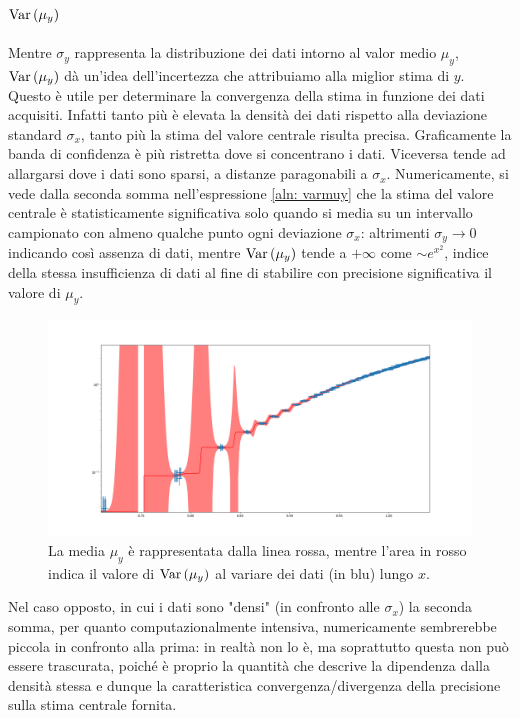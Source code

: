 \documentclass{article}[a4paper, oneside, 11pt]
\begin{document}
\subsection{$\text{Var}\left(\mu_y\right)$}
Mentre $\sigma_y$ rappresenta la distribuzione dei dati intorno al valor medio 
$\mu_y$, $\text{Var}\left(\mu_y\right)$ dà un'idea dell’incertezza che attribuiamo alla
miglior stima di $y$. Questo è utile per determinare la convergenza della
stima in funzione dei dati acquisiti.
Infatti tanto più è elevata la densità dei dati rispetto alla deviazione standard
$\sigma_x$, tanto più la stima del valore centrale risulta precisa. Graficamente
la banda di confidenza è più ristretta dove si concentrano i dati. Viceversa
tende ad allargarsi dove i dati sono sparsi, a distanze paragonabili a
$\sigma_x$. Numericamente, si vede dalla seconda somma nell'espressione
\eqref{aln: varmuy} che la stima del valore centrale è statisticamente
significativa solo quando si media su un intervallo campionato con almeno
qualche punto ogni deviazione $\sigma_x$: altrimenti $\sigma_y \to 0$
indicando così assenza di dati, mentre $\text{Var}\left(\mu_y\right)$ tende a $+\infty$ come
$\sim e^{x^2}$, indice della stessa insufficienza di dati al fine di stabilire
con precisione significativa il valore di $\mu_y$.
\begin{figure}[!htbp]
	\centering 
 		\includegraphics[scale=0.32]{./varmuy.png}
 	\caption{La media $\mu_y$ è rappresentata dalla linea rossa, mentre
	l'area in rosso indica il valore di $\text{Var}\left(\mu_y\right)$ al variare dei
	dati (in blu) lungo $x$. \label{fig: varmuy}}
\end{figure}
Nel caso opposto, in cui i dati sono "densi" (in confronto alle $\sigma_x$)
la seconda somma, per quanto computazionalmente intensiva, numericamente
sembrerebbe piccola in confronto alla prima: in realtà non lo è, ma
soprattutto questa non può essere trascurata, poiché è proprio la quantità
che descrive la dipendenza dalla densità stessa e dunque la caratteristica
convergenza/divergenza della precisione sulla stima centrale fornita.
\end{document}
